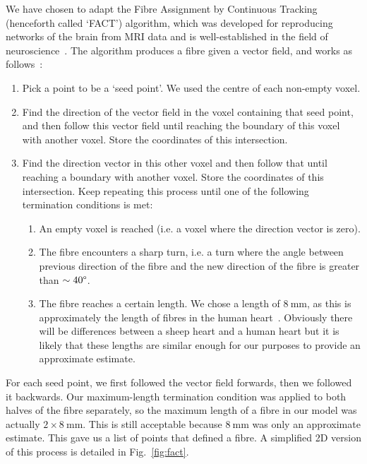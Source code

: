 We have chosen to adapt the Fibre Assignment by Continuous Tracking (henceforth called `FACT') algorithm, which was developed for reproducing networks of the brain from MRI data and is well-established in the field of neuroscience~\cite{fact, bello2008motor}. The algorithm produces a fibre given a vector field, and works as follows~\cite{fact}:
\begin{enumerate}
    \item Pick a point to be a `seed point'. We used the centre of each non-empty voxel.
    \item Find the direction of the vector field in the voxel containing that seed point, and then follow this vector field until reaching the boundary of this voxel with another voxel. Store the coordinates of this intersection.
    \item Find the direction vector in this other voxel and then follow that until reaching a boundary with another voxel. Store the coordinates of this intersection. Keep repeating this process until one of the following termination conditions is met:
    \begin{enumerate}
        \item An empty voxel is reached (i.e. a voxel where the direction vector is zero).
        \item The fibre encounters a sharp turn, i.e. a turn where the angle between previous direction of the fibre and the new direction of the fibre is greater than $\sim 40 \degree$.
        \item The fibre reaches a certain length. We chose a length of $8~\mathrm{mm}$, as this is approximately the length of fibres in the human heart~\cite{schwinger1994failing}. Obviously there will be differences between a sheep heart and a human heart but it is likely that these lengths are similar enough for our purposes to provide an approximate estimate.
    \end{enumerate}
\end{enumerate}
For each seed point, we first followed the vector field forwards, then we followed it backwards. Our maximum-length termination condition was applied to both halves of the fibre separately, so the maximum length of a fibre in our model was actually $2 \times 8~\mathrm{mm}$. This is still acceptable because $8~\mathrm{mm}$ was only an approximate estimate. This gave us a list of points that defined a fibre. A simplified 2D version of this process is detailed in Fig.~\ref{fig:fact}.

